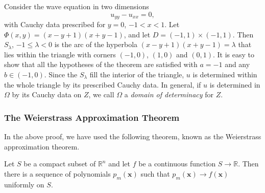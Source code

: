 \begin{Example}
\label{ex:wave-cauchy-domain-of-determinacy}
Consider the wave equation in two dimensions
\begin{equation}\label{eq:wave-determinacy-example}
u_{yy}-u_{xx}=0,
\end{equation}
with Cauchy data prescribed for $y=0$, $-1<x<1$. Let $\Phi(x,y)=(x-y+1)(x+y-1)$, and let $D=(-1,1)\times(-1,1)$. Then $S_\lambda$, $-1\leq\lambda<0$ is the arc of the hyperbola $(x-y+1)(x+y-1)=\lambda$ that lies within the triangle with corners $(-1,0)$, $(1,0)$ and $(0,1)$. It is easy to show that all the hypotheses of the theorem are satisfied with $a=-1$ and any $b\in(-1,0)$. Since the $S_\lambda$ fill the interior of the triangle, $u$ is determined within the whole triangle by its prescribed Cauchy data. In general, if $u$ is determined in $\Omega$ by its Cauchy data on $Z$, we call $\Omega$ a \emph{domain of determinacy} for $Z$.
\end{Example}

\subsubsection{The Weierstrass Approximation Theorem}\label{subsec:weierstrass-approximation}

In the above proof, we have used the following theorem, known as the Weierstrass approximation theorem.

\begin{Theorem}
\label{thm:weierstrass-approximation}
Let $S$ be a compact subset of $\mathbb{R}^n$ and let $f$ be a continuous function $S\to\mathbb{R}$. Then there is a sequence of polynomials $p_m(\bm{x})$ such that $p_m(\bm{x})\to f(\bm{x})$ uniformly on $S$.
\end{Theorem}


